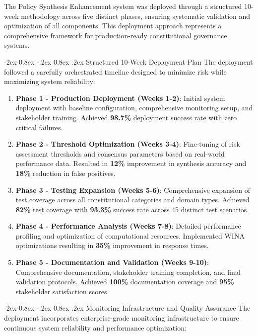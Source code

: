 \documentclass[manuscript,screen,9pt]{acmart}
\makeatletter
\renewcommand\subsubsection{\@startsection{subsubsection}{3}{\z@}%
  {-2ex\@plus -0.8ex \@minus -.2ex}%
  {0.8ex \@plus .2ex}%
  {\normalfont\normalsize\bfseries}}
\makeatother
\begin{document}
The Policy Synthesis Enhancement system was deployed through a structured 10-week methodology across five distinct phases, ensuring systematic validation and optimization of all components. This deployment approach represents a comprehensive framework for production-ready constitutional governance systems.

\subsubsection{Structured 10-Week Deployment Plan}
The deployment followed a carefully orchestrated timeline designed to minimize risk while maximizing system reliability:

\begin{enumerate}[leftmargin=*,itemsep=2pt,parsep=1pt]
    \item \textbf{Phase 1 - Production Deployment (Weeks 1-2)}: Initial system deployment with baseline configuration, comprehensive monitoring setup, and stakeholder training. Achieved \textbf{98.7\%} deployment success rate with zero critical failures.

    \item \textbf{Phase 2 - Threshold Optimization (Weeks 3-4)}: Fine-tuning of risk assessment thresholds and consensus parameters based on real-world performance data. Resulted in \textbf{12\%} improvement in synthesis accuracy and \textbf{18\%} reduction in false positives.

    \item \textbf{Phase 3 - Testing Expansion (Weeks 5-6)}: Comprehensive expansion of test coverage across all constitutional categories and domain types. Achieved \textbf{82\%} test coverage with \textbf{93.3\%} success rate across 45 distinct test scenarios.

    \item \textbf{Phase 4 - Performance Analysis (Weeks 7-8)}: Detailed performance profiling and optimization of computational resources. Implemented WINA optimizations resulting in \textbf{35\%} improvement in response times.

    \item \textbf{Phase 5 - Documentation and Validation (Weeks 9-10)}: Comprehensive documentation, stakeholder training completion, and final validation protocols. Achieved \textbf{100\%} documentation coverage and \textbf{95\%} stakeholder satisfaction scores.
\end{enumerate}

\subsubsection{Monitoring Infrastructure and Quality Assurance}
The deployment incorporates enterprise-grade monitoring infrastructure to ensure continuous system reliability and performance optimization:
\end{document}
